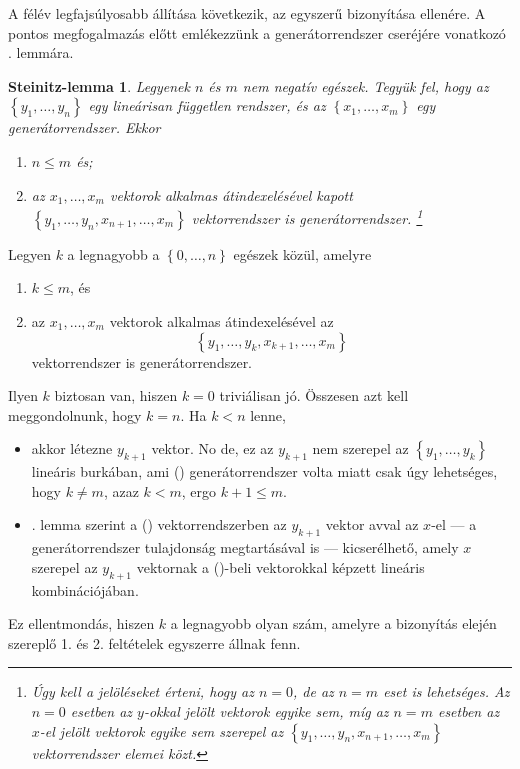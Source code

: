 \documentclass[a4paper, showtrims]{memoir}
\makeatletter
\renewenvironment{proof}[1][\proofname]
    {\par\pushQED{\qed}%
    \normalfont \topsep6\p@\@plus6\p@\relax
    \trivlist
    \item[\hskip\labelsep
        \itshape
    #1\@addpunct{:}]\ignorespaces}
    {\popQED\endtrivlist\@endpefalse}
\theoremstyle{plain}
\newtheorem*{SL}{Steinitz-lemma}
\theoremstyle{remark}
\theoremstyle{definition}
\makeatother
\begin{document}
A félév legfajsúlyosabb állítása következik, az egyszerű bizonyítása ellenére.
A pontos megfogalmazás előtt emlékezzünk a generátorrendszer cseréjére vonatkozó . lemmára.
\begin{SL}
	Legyenek $n$ és $m$ nem negatív egészek.
	Tegyük fel, hogy az $\left\{ y_1,\ldots,y_n \right\}$ egy lineárisan független rendszer,
	és az
	$\left\{ x_1,\ldots,x_m \right\}$ egy generátorrendszer.
	Ekkor
	\begin{enumerate}
		\item $n\leq m$ és;
		\item az $x_1,\ldots,x_m$ vektorok alkalmas átindexelésével kapott
		      \(
		      \left\{ y_1,\ldots,y_n,x_{n+1},\ldots,x_m \right\}
		      \)
		      vektorrendszer is generátorrendszer.%
		      \footnote{Úgy kell a jelöléseket érteni, hogy az $n=0$, de az $n=m$ eset is lehetséges.
		      Az $n=0$ esetben az $y$-okkal jelölt vektorok egyike sem,
		      míg az $n=m$ esetben az $x$-el jelölt vektorok egyike sem szerepel az
		      \(
		      \left\{ y_1,\ldots,y_n,x_{n+1},\ldots,x_m \right\}
		      \)
		      vektorrendszer elemei közt.}%
		      \qedhere
	\end{enumerate}
	\label{le:Steinitz}
\end{SL}
\begin{proof}
	Legyen $k$ a legnagyobb a $\left\{ 0,\ldots,n \right\}$ egészek közül, amelyre
	\begin{enumerate}
		\item $k\leq m$, és
		\item az $x_1,\ldots,x_m$ vektorok alkalmas átindexelésével az
		      \[
			      \left\{ y_1,\ldots,y_k,x_{k+1},\ldots,x_m \right\}\tag{\dag}
		      \]
		      vektorrendszer is generátorrendszer.
	\end{enumerate}
	Ilyen $k$ biztosan van, hiszen $k=0$ triviálisan jó.
	Összesen azt kell meggondolnunk, hogy $k=n$.
	Ha $k<n$ lenne,
	\begin{itemize}
		\item
		      akkor létezne $y_{k+1}$ vektor.
		      No de, ez az $y_{k+1}$ nem szerepel az $\left\{ y_1,\ldots,y_k \right\}$ lineáris burkában,
		      ami (\dag) generátorrendszer volta miatt csak úgy lehetséges,
		      hogy $k\neq m$, azaz $k<m$, ergo $k+1\leq m$.
		\item
            . lemma szerint a (\dag) vektorrendszerben az $y_{k+1}$ vektor
		      avval az $x$-el
		      --- a generátorrendszer tulajdonság megtartásával is ---
		      kicserélhető,
		      amely $x$ szerepel az $y_{k+1}$ vektornak a (\dag)-beli
		      vektorokkal képzett lineáris kombinációjában.
	\end{itemize}
	Ez ellentmondás, hiszen $k$ a legnagyobb olyan szám,
	amelyre a bizonyítás elején szereplő 1. és 2. feltételek egyszerre állnak fenn.
\end{proof}
\end{document}
